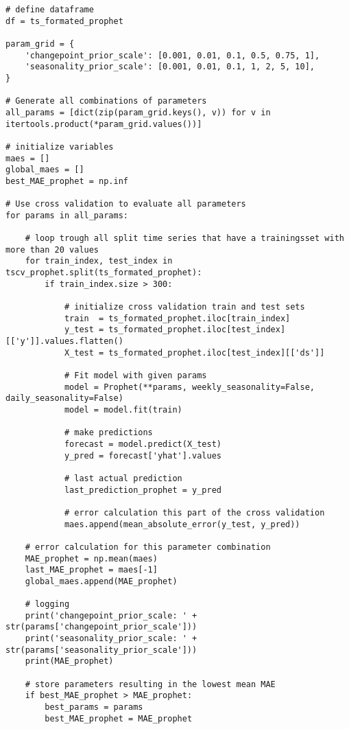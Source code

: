 \begin{verbatim}
# define dataframe
df = ts_formated_prophet

param_grid = {  
    'changepoint_prior_scale': [0.001, 0.01, 0.1, 0.5, 0.75, 1],
    'seasonality_prior_scale': [0.001, 0.01, 0.1, 1, 2, 5, 10],
}

# Generate all combinations of parameters
all_params = [dict(zip(param_grid.keys(), v)) for v in itertools.product(*param_grid.values())]

# initialize variables
maes = []  
global_maes = []
best_MAE_prophet = np.inf

# Use cross validation to evaluate all parameters
for params in all_params:

    # loop trough all split time series that have a trainingsset with more than 20 values
    for train_index, test_index in tscv_prophet.split(ts_formated_prophet):    
        if train_index.size > 300:  
            
            # initialize cross validation train and test sets
            train  = ts_formated_prophet.iloc[train_index]
            y_test = ts_formated_prophet.iloc[test_index][['y']].values.flatten()
            X_test = ts_formated_prophet.iloc[test_index][['ds']]

            # Fit model with given params
            model = Prophet(**params, weekly_seasonality=False, daily_seasonality=False)
            model = model.fit(train)
            
            # make predictions
            forecast = model.predict(X_test)
            y_pred = forecast['yhat'].values
            
            # last actual prediction 
            last_prediction_prophet = y_pred
            
            # error calculation this part of the cross validation
            maes.append(mean_absolute_error(y_test, y_pred))
            
    # error calculation for this parameter combination
    MAE_prophet = np.mean(maes)
    last_MAE_prophet = maes[-1]
    global_maes.append(MAE_prophet)
    
    # logging
    print('changepoint_prior_scale: ' + str(params['changepoint_prior_scale']))
    print('seasonality_prior_scale: ' + str(params['seasonality_prior_scale']))
    print(MAE_prophet)
    
    # store parameters resulting in the lowest mean MAE
    if best_MAE_prophet > MAE_prophet:
        best_params = params
        best_MAE_prophet = MAE_prophet


\end{verbatim}

